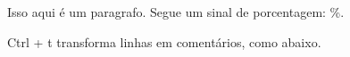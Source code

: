 \documentclass{article}
\begin{document}
	Isso aqui é um paragrafo. Segue um sinal de porcentagem: \%.
	
	Ctrl + t transforma linhas em comentários, como abaixo.
	
	
	
\end{document}
